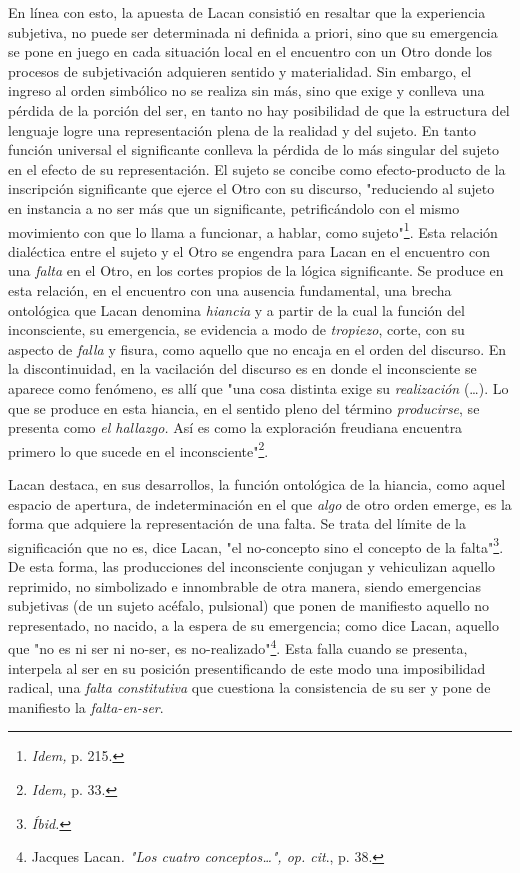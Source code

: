 \documentclass{book}
\begin{document}
En línea con esto, la apuesta de Lacan consistió en resaltar que la
experiencia subjetiva, no puede ser determinada ni definida a priori,
sino que su emergencia se pone en juego en cada situación local en el
encuentro con un Otro donde los procesos de subjetivación adquieren
sentido y materialidad. Sin embargo, el ingreso al orden simbólico no se
realiza sin más, sino que exige y conlleva una pérdida de la porción del
ser, en tanto no hay posibilidad de que la estructura del lenguaje logre
una representación plena de la realidad y del sujeto. En tanto función
universal el significante conlleva la pérdida de lo más singular del
sujeto en el efecto de su representación. El sujeto se concibe como
efecto-producto de la inscripción significante que ejerce el Otro con su
discurso, "reduciendo al sujeto en instancia a no ser más que un
significante, petrificándolo con el mismo movimiento con que lo llama a
funcionar, a hablar, como sujeto"\footnote{\emph{Idem,} p. 215.}. Esta
relación dialéctica entre el sujeto y el Otro se engendra para Lacan en
el encuentro con una \emph{falta} en el Otro, en los cortes propios de
la lógica significante. Se produce en esta relación, en el encuentro con
una ausencia fundamental, una brecha ontológica que Lacan denomina
\emph{hiancia} y a partir de la cual la función del inconsciente, su
emergencia, se evidencia a modo de \emph{tropiezo}, corte, con su
aspecto de \emph{falla} y fisura, como aquello que no encaja en el orden
del discurso. En la discontinuidad, en la vacilación del discurso es en
donde el inconsciente se aparece como fenómeno, es allí que "una cosa
distinta exige su \emph{realización} (\dots). Lo que se produce en
esta hiancia, en el sentido pleno del término \emph{producirse}, se
presenta como \emph{el hallazgo.} Así es como la exploración freudiana
encuentra primero lo que sucede en el inconsciente"\footnote{\emph{Idem,}
  p. 33.}.

Lacan destaca, en sus desarrollos, la función ontológica de la hiancia,
como aquel espacio de apertura, de indeterminación en el que \emph{algo}
de otro orden emerge, es la forma que adquiere la representación de una
falta. Se trata del límite de la significación que no es, dice Lacan,
"el no-concepto sino el concepto de la falta"\footnote{\emph{Íbid.}}. De
esta forma, las producciones del inconsciente conjugan y vehiculizan
aquello reprimido, no simbolizado e innombrable de otra manera, siendo
emergencias subjetivas (de un sujeto acéfalo, pulsional) que ponen de
manifiesto aquello no representado, no nacido, a la espera de su
emergencia; como dice Lacan, aquello que "no es ni ser ni no-ser, es
no-realizado"\footnote{Jacques Lacan\emph{. "Los cuatro
  conceptos\ldots", op. cit}., p. 38.}. Esta falla cuando se presenta,
interpela al ser en su posición presentificando de este modo una
imposibilidad radical, una \emph{falta constitutiva} que cuestiona la
consistencia de su ser y pone de manifiesto la \emph{falta-en-ser}.
\end{document}
